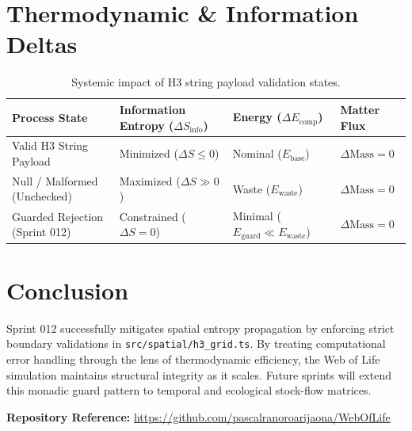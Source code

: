 \documentclass[11pt, a4paper]{article}
\begin{document}
\section{Thermodynamic \& Information Deltas}
\begin{table}[htbp]
\centering
\caption{Systemic impact of H3 string payload validation states.}
\begin{tabular}{llll}
\toprule
\textbf{Process State} & \textbf{Information Entropy ($\Delta S_{\text{info}}$)} & \textbf{Energy ($\Delta E_{\text{comp}}$)} & \textbf{Matter Flux} \\
\midrule
Valid H3 String Payload & Minimized ($\Delta S \le 0$) & Nominal ($E_{\text{base}}$) & $\Delta \text{Mass} = 0$ \\
Null / Malformed (Unchecked) & Maximized ($\Delta S \gg 0$) & Waste ($E_{\text{waste}}$) & $\Delta \text{Mass} = 0$ \\
Guarded Rejection (Sprint 012) & Constrained ($\Delta S = 0$) & Minimal ($E_{\text{guard}} \ll E_{\text{waste}}$) & $\Delta \text{Mass} = 0$ \\
\bottomrule
\end{tabular}
\end{table}

\section{Conclusion}
Sprint 012 successfully mitigates spatial entropy propagation by enforcing strict boundary validations in \texttt{src/spatial/h3\_grid.ts}. By treating computational error handling through the lens of thermodynamic efficiency, the Web of Life simulation maintains structural integrity as it scales. Future sprints will extend this monadic guard pattern to temporal and ecological stock-flow matrices.

\vspace{1em}
\noindent\textbf{Repository Reference:} \url{https://github.com/pascalranoroarijaona/WebOfLife}
\end{document}
